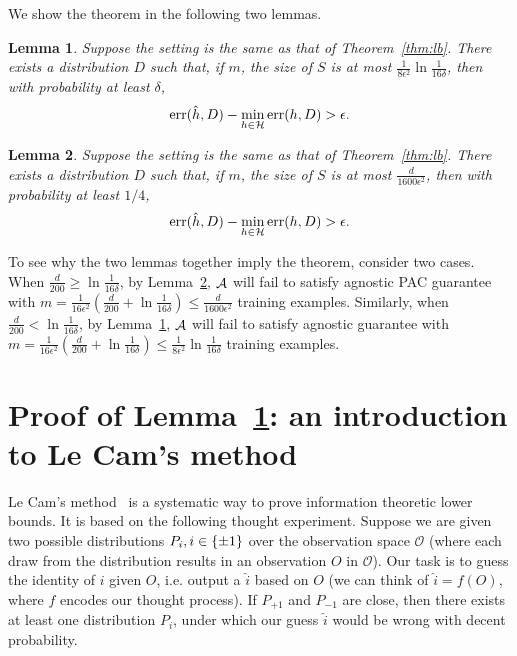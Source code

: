 \documentclass{article}
\newtheorem{lemma}{Lemma}
\DeclareMathOperator*{\err}{{\rm err}}
\DeclareMathOperator*{\Acal}{{\cal A}}
\newcommand{\Hcal}{\mathcal{H}}
\newcommand{\Ocal}{\mathcal{O}}
\begin{document}
We show the theorem in the following two lemmas.

\begin{lemma}
Suppose the setting is the same as that of Theorem~\ref{thm:lb}. There exists
a distribution $D$ such that, if $m$,
the size of $S$ is at most $\frac{1}{8\epsilon^2}\ln\frac1{16\delta}$,
then with probability at least $\delta$,
\[ \err(\hat{h}, D) - \min_{h \in \Hcal} \err(h, D) > \epsilon. \]
\label{lem:delta}
\end{lemma}

\begin{lemma}
Suppose the setting is the same as that of Theorem~\ref{thm:lb}. There exists
a distribution $D$ such that, if $m$,
the size of $S$ is at most $\frac{d}{1600\epsilon^2}$, then with probability at least
$1/4$,
\[ \err(\hat{h}, D) - \min_{h \in \Hcal} \err(h, D) > \epsilon. \]
\label{lem:d}
\end{lemma}

To see why the two lemmas together imply the theorem, consider two cases. When
$\frac{d}{200} \geq \ln\frac1{16\delta}$, by Lemma~\ref{lem:d}, $\Acal$ will fail to satisfy
agnostic PAC guarantee with
$m = \frac{1}{16\epsilon^2}(\frac{d}{200} + \ln\frac1{16\delta}) \leq \frac{d}{1600\epsilon^2}$ training examples. Similarly, when $\frac{d}{200} < \ln\frac1{16\delta}$, by Lemma~\ref{lem:delta}, $\Acal$ will fail to satisfy
agnostic guarantee with $m = \frac{1}{16\epsilon^2}(\frac{d}{200} + \ln\frac1{16\delta}) \leq \frac{1}{8\epsilon^2}\ln\frac1{16\delta}$ training examples.

\section{Proof of Lemma~\ref{lem:delta}: an introduction to Le Cam's method}
Le Cam's method~\cite{yu1997assouad} is a systematic way to prove information theoretic
lower bounds. It is based on the following thought experiment. Suppose we are given two possible distributions $P_i, i \in \cbr{\pm 1}$ over the observation space $\Ocal$ (where each draw from the distribution results in an observation $O$ in $\Ocal$).
Our task is to guess the identity of $i$ given $O$, i.e. output a $\hat{i}$ based on $O$ (we can think of $\hat{i} = f(O)$, where $f$ encodes our thought process). If $P_{+1}$ and $P_{-1}$ are close, then there exists at least one distribution $P_i$, under which our guess $\hat{i}$ would be wrong with decent probability.
\end{document}
